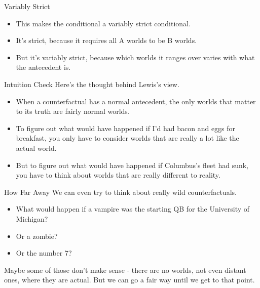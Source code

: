 \documentclass[
  ignorenonframetext,
]{beamer}
\providecommand{\tightlist}{%
  \setlength{\itemsep}{0pt}\setlength{\parskip}{0pt}}
\renewcommand{\,}{\text{, }}
\begin{document}
\begin{frame}{Variably Strict}
\protect\hypertarget{variably-strict}{}
\begin{itemize}
\tightlist
\item
  This makes the conditional a variably strict conditional.
\item
  It's strict, because it requires all A worlds to be B worlds.
\item
  But it's variably strict, because which worlds it ranges over varies
  with what the antecedent is.
\end{itemize}
\end{frame}

\begin{frame}{Intuition Check}
\protect\hypertarget{intuition-check}{}
Here's the thought behind Lewis's view.

\begin{itemize}
\tightlist
\item
  When a counterfactual has a normal antecedent, the only worlds that
  matter to its truth are fairly normal worlds.
\item
  To figure out what would have happened if I'd had bacon and eggs for
  breakfast, you only have to consider worlds that are really a lot like
  the actual world.
\item
  But to figure out what would have happened if Columbus's fleet had
  sunk, you have to think about worlds that are really different to
  reality.
\end{itemize}
\end{frame}

\begin{frame}{How Far Away}
\protect\hypertarget{how-far-away}{}
We can even try to think about really wild counterfactuals.

\begin{itemize}[<+->]
\tightlist
\item
  What would happen if a vampire was the starting QB for the University
  of Michigan?
\item
  Or a zombie?
\item
  Or the number 7? \pause
\end{itemize}

Maybe some of those don't make sense - there are no worlds, not even
distant ones, where they are actual. But we can go a fair way until we
get to that point.
\end{frame}
\end{document}
